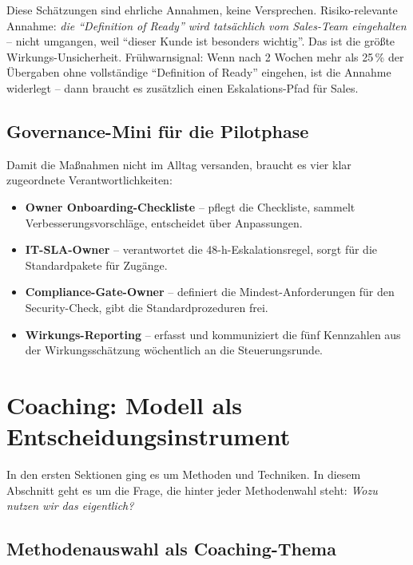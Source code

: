 \documentclass[11pt,a4paper,oneside]{article}
\newcommand{\fachbegriff}[1]{\textbf{#1}}
\begin{document}
\medskip

\noindent Diese Schätzungen sind ehrliche Annahmen, keine Versprechen. Risiko-relevante Annahme: \emph{die ``Definition of Ready'' wird tatsächlich vom Sales-Team eingehalten} -- nicht umgangen, weil ``dieser Kunde ist besonders wichtig''. Das ist die größte Wirkungs-Unsicherheit. Frühwarnsignal: Wenn nach 2 Wochen mehr als 25\,\% der Übergaben ohne vollständige ``Definition of Ready'' eingehen, ist die Annahme widerlegt -- dann braucht es zusätzlich einen Eskalations-Pfad für Sales.

\subsection{Governance-Mini für die Pilotphase}

Damit die Maßnahmen nicht im Alltag versanden, braucht es vier klar zugeordnete Verantwortlichkeiten:

\begin{itemize}
  \item \fachbegriff{Owner Onboarding-Checkliste} -- pflegt die Checkliste, sammelt Verbesserungsvorschläge, entscheidet über Anpassungen.
  \item \fachbegriff{IT-SLA-Owner} -- verantwortet die 48-h-Eskalationsregel, sorgt für die Standardpakete für Zugänge.
  \item \fachbegriff{Compliance-Gate-Owner} -- definiert die Mindest-Anforderungen für den Security-Check, gibt die Standardprozeduren frei.
  \item \fachbegriff{Wirkungs-Reporting} -- erfasst und kommuniziert die fünf Kennzahlen aus der Wirkungsschätzung wöchentlich an die Steuerungsrunde.
\end{itemize}

\section{Coaching: Modell als Entscheidungsinstrument}

In den ersten Sektionen ging es um Methoden und Techniken. In diesem Abschnitt geht es um die Frage, die hinter jeder Methodenwahl steht: \emph{Wozu nutzen wir das eigentlich?}

\subsection{Methodenauswahl als Coaching-Thema}
\end{document}
